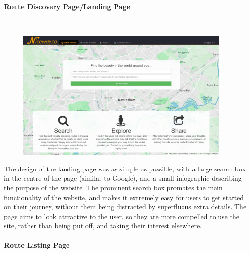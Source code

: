 \paragraph{Route Discovery Page/Landing Page}\ \\

\begin{figure}[!ht]
	\vspace{-6mm}
	\begin{center}
		\includegraphics[width=0.95\textwidth]{images/design/landing.png}
	\end{center}
	\vspace{-7mm}
\end{figure}
\noindent 
The design of the landing page was as simple as possible, with a large search box in the centre of the page (similar to Google), and a small infographic describing the purpose of the website. The prominent search box promotes the main functionality of the website, and makes it extremely easy for users to get started on their journey, without them being distracted by superfluous extra details. The page aims to look attractive to the user, so they are more compelled to use the site, rather than being put off, and taking their interest elsewhere.

\paragraph{Route Listing Page}\ \\

